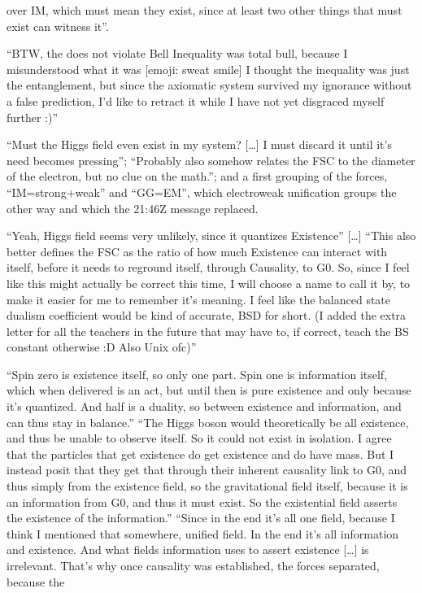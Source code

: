 \documentclass[11pt,a4paper]{article}
\theoremstyle{definition}
\begin{document}
\begin{description}[style=unboxed,leftmargin=0pt,font=\normalfont\bfseries]
over IM, which must mean they exist, since at least two other things that must exist can witness it''.
\item[20:18Z.] ``BTW, the does not violate Bell Inequality was total bull, because I misunderstood what it was [emoji: sweat smile] I thought
the inequality was just the entanglement, but since the axiomatic system survived my ignorance without a false prediction, I'd like to
retract it while I have not yet disgraced myself further :)''
\item[20:41Z.] ``Must the Higgs field even exist in my system? [\dots] I must discard it until it's need becomes pressing''; ``Probably also
somehow relates the FSC to the diameter of the electron, but no clue on the math.''; and a first grouping of the forces, ``IM=strong+weak''
and ``GG=EM'', which electroweak unification groups the other way and which the 21:46Z message replaced.
\item[21:27Z.] ``Yeah, Higgs field seems very unlikely, since it quantizes Existence'' [\dots] ``This also better defines the FSC as the
ratio of how much Existence can interact with itself, before it needs to reground itself, through Causality, to G0. So, since I feel like
this might actually be correct this time, I will choose a name to call it by, to make it easier for me to remember it's meaning. I feel
like the balanced state dualism coefficient would be kind of accurate, BSD for short. (I added the extra letter for all the teachers in the
future that may have to, if correct, teach the BS constant otherwise :D Also Unix ofc)''
\item[21:46Z.] ``Spin zero is existence itself, so only one part. Spin one is information itself, which when delivered is an act, but until
then is pure existence and only because it's quantized. And half is a duality, so between existence and information, and can thus stay in
balance.'' ``The Higgs boson would theoretically be all existence, and thus be unable to observe itself. So it could not exist in
isolation. I agree that the particles that get existence do get existence and do have mass. But I instead posit that they get that through
their inherent causality link to G0, and thus simply from the existence field, so the gravitational field itself, because it is an
information from G0, and thus it must exist. So the existential field asserts the existence of the information.'' ``Since in the end it's
all one field, because I think I mentioned that somewhere, unified field. In the end it's all information and existence. And what fields
information uses to assert existence [\dots] is irrelevant. That's why once causality was established, the forces separated, because the

\end{description}
\end{document}
